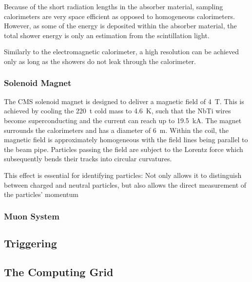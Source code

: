 Because of the short radiation lengths in the absorber material, sampling calorimeters are very space efficient as opposed to homogeneous calorimeters.
However, as some of the energy is deposited within the absorber material, the total shower energy is only an estimation from the scintillation light.

Similarly to the electromagnetic calorimeter, a high resolution can be achieved only as long as the showers do not leak through the calorimeter.

\subsubsection{Solenoid Magnet}
The \ac{CMS} solenoid magnet is designed to deliver a magnetic field of \SI{4}{\tesla}. This is achieved by cooling the \SI{220}{\tonne} cold mass to \SI{4.6}{\kelvin}, such that the NbTi wires become superconducting and the current can reach up to \SI{19.5}{\kilo\ampere}.
The magnet surrounds the calorimeters and has a diameter of \SI{6}{\meter}. Within the coil, the magnetic field is approximately homogeneous with the field lines being parallel to the beam pipe. 
Particles passing the field are subject to the Lorentz force which subsequently bends their tracks into circular curvatures.

This effect is essential for identifying particles: Not only allows it to distinguish between charged and neutral particles, but also allows the direct measurement of the particles' momentum 


\subsubsection{Muon System}

\subsection{Triggering}
\subsection{The Computing Grid}
